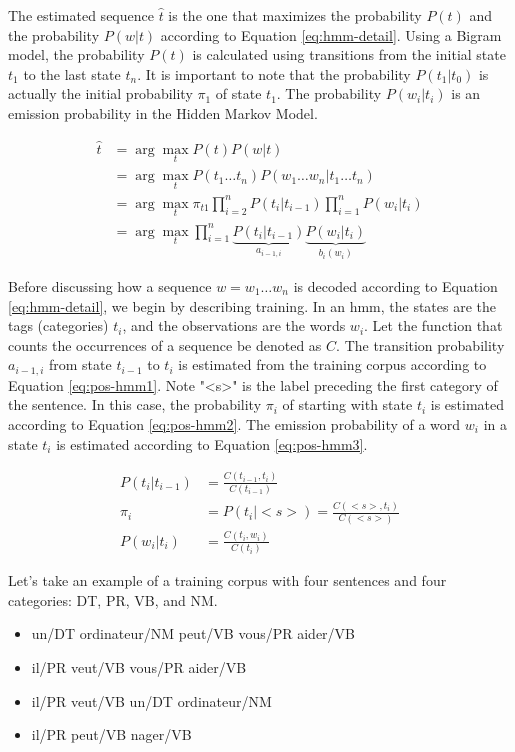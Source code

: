 \documentclass{KBook}
\begin{document}
The estimated sequence $\hat{t}$ is the one that maximizes the probability $P(t)$ and the probability $P(w | t)$ according to Equation \ref{eq:hmm-detail}. Using a Bigram model, the probability $P(t)$ is calculated using transitions from the initial state $t_1$ to the last state $t_n$. It is important to note that the probability $P(t_1|t_0)$ is actually the initial probability $\pi_1$ of state $t_1$. The probability $P(w_i | t_i)$ is an emission probability in the Hidden Markov Model.

\begin{align}
	\hat{t} & = \arg\max\limits_t P(t) P(w | t) \nonumber\\
	& = \arg\max\limits_t P(t_1 \dots t_n) P(w_1 \dots w_n | t_1 \dots t_n) \nonumber\\
	& = \arg\max\limits_t \pi_{t1} \prod_{i=2}^{n} P(t_i|t_{i-1}) \prod_{i=1}^{n} P(w_i| t_i) \nonumber\\
	& = \arg\max\limits_t \prod_{i=1}^{n} \underbrace{P(t_i|t_{i-1})}_{a_{i-1,i}} \underbrace{P(w_i | t_i)}_{b_i(w_i)} \label{eq:hmm-detail}
\end{align}

Before discussing how a sequence $w=w_1 \ldots w_n$ is decoded according to Equation \ref{eq:hmm-detail}, we begin by describing training. In an \ac{hmm}, the states are the tags (categories) $t_i$, and the observations are the words $w_i$. Let the function that counts the occurrences of a sequence be denoted as $C$. The transition probability $a_{i-1,i}$ from state $t_{i-1}$ to $t_i$ is estimated from the training corpus according to Equation \ref{eq:pos-hmm1}. Note "<s>" is the label preceding the first category of the sentence. In this case, the probability $\pi_i$ of starting with state $t_i$ is estimated according to Equation \ref{eq:pos-hmm2}. The emission probability of a word $w_i$ in a state $t_i$ is estimated according to Equation \ref{eq:pos-hmm3}.

\begin{align}
	P(t_i | t_{i-1}) & = \frac{C(t_{i-1}, t_i)}{C(t_{i-1})}  \label{eq:pos-hmm1} \\
	\pi_i & = P(t_i | <s>) = \frac{C(<s>, t_i)}{C(<s>)} \label{eq:pos-hmm2} \\
	P(w_i | t_i) & = \frac{C(t_i, w_i)}{C(t_i)} \label{eq:pos-hmm3}
\end{align}

Let's take an example of a training corpus with four sentences and four categories: DT, PR, VB, and NM.

\begin{itemize}
	\item un/DT ordinateur/NM peut/VB vous/PR aider/VB
	\item il/PR veut/VB vous/PR aider/VB
	\item il/PR veut/VB un/DT ordinateur/NM
	\item il/PR peut/VB nager/VB
\end{itemize}
\end{document}
